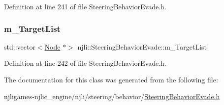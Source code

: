 Definition at line 241 of file Steering\+Behavior\+Evade.\+h.

\mbox{\label{classnjli_1_1_steering_behavior_evade_acada4d21166aa029aec597546182c44b}} 
\subsubsection{\texorpdfstring{m\+\_\+\+Target\+List}{m\_TargetList}}
{\footnotesize\ttfamily std\+::vector$<$\mbox{\hyperlink{classnjli_1_1_node}{Node}} $\ast$$>$ njli\+::\+Steering\+Behavior\+Evade\+::m\+\_\+\+Target\+List\hspace{0.3cm}{\ttfamily [private]}}



Definition at line 242 of file Steering\+Behavior\+Evade.\+h.



The documentation for this class was generated from the following file\+:\begin{DoxyCompactItemize}
\item 
njligames-\/njlic\+\_\+engine/njli/steering/behavior/\mbox{\hyperlink{_steering_behavior_evade_8h}{Steering\+Behavior\+Evade.\+h}}\end{DoxyCompactItemize}
